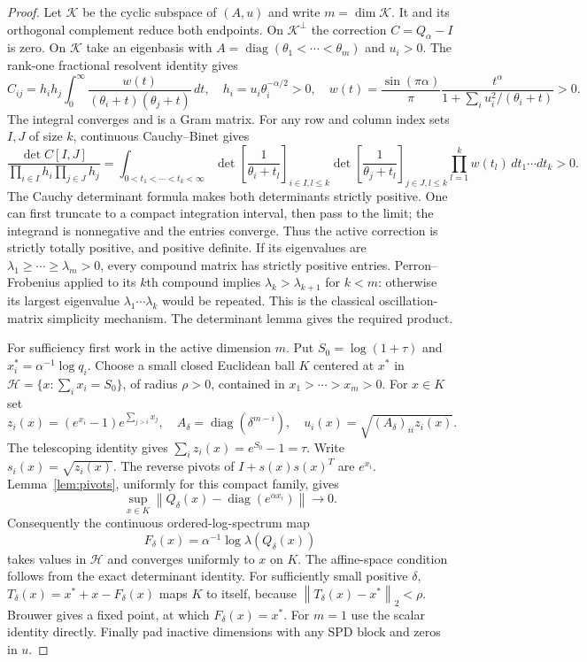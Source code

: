 \documentclass[11pt]{article}
\newcommand{\diag}{\operatorname{diag}}
\newcommand{\norm}[1]{\left\lVert#1\right\rVert}
\begin{document}
\begin{proof}
Let $\mathcal K$ be the cyclic subspace of $(A,u)$ and write
$m=\dim\mathcal K$. It and its orthogonal complement reduce both
endpoints. On $\mathcal K^\perp$ the correction $C=Q_\alpha-I$ is zero.
On $\mathcal K$ take an eigenbasis with
$A=\diag(\theta_1<\cdots<\theta_m)$ and $u_i>0$.
The rank-one fractional resolvent identity gives
\[
 C_{ij}=h_i h_j\int_0^\infty
 \frac{w(t)}{(\theta_i+t)(\theta_j+t)}\,dt,
 \quad h_i=u_i\theta_i^{-\alpha/2}>0,
 \quad
 w(t)=\frac{\sin(\pi\alpha)}\pi
 \frac{t^\alpha}{1+\sum_i u_i^2/(\theta_i+t)}>0.
\]
The integral converges and is a Gram matrix. For any row and column
index sets $I,J$ of size $k$, continuous Cauchy--Binet gives
\[
 \frac{\det C[I,J]}{\prod_{i\in I}h_i\prod_{j\in J}h_j}
 =\int_{0<t_1<\cdots<t_k<\infty}
 \det\left[\frac1{\theta_i+t_l}\right]_{i\in I,l\le k}
 \det\left[\frac1{\theta_j+t_l}\right]_{j\in J,l\le k}
 \prod_{l=1}^k w(t_l)\,dt_1\cdots dt_k>0.
\]
The Cauchy determinant formula makes both determinants strictly positive.
One can first truncate to a compact integration interval, then pass
to the limit; the integrand is nonnegative and the entries converge.
Thus the active correction is strictly totally positive, and positive
definite. If its eigenvalues are
$\lambda_1\ge\cdots\ge\lambda_m>0$, every compound matrix has
strictly positive entries. Perron--Frobenius applied to its $k$th
compound implies $\lambda_k>\lambda_{k+1}$ for $k<m$:
otherwise its largest eigenvalue $\lambda_1\cdots\lambda_k$ would be
repeated. This is the classical oscillation-matrix simplicity mechanism.
The determinant lemma gives the required product.

For sufficiency first work in the active dimension $m$.
Put $S_0=\log(1+\tau)$ and $x_i^*=\alpha^{-1}\log q_i$.
Choose a small closed Euclidean ball $K$ centered at $x^*$ in
$\mathcal H=\{x:\sum_i x_i=S_0\}$, of radius $\rho>0$,
contained in $x_1>\cdots>x_m>0$. For $x\in K$ set
\[
 z_i(x)=(e^{x_i}-1)e^{\sum_{j>i}x_j},\quad
 A_\delta=\diag(\delta^{m-i}),\quad
 u_i(x)=\sqrt{(A_\delta)_{ii}z_i(x)}.
\]
The telescoping identity gives $\sum_i z_i(x)=e^{S_0}-1=\tau$.
Write $s_i(x)=\sqrt{z_i(x)}$. The reverse pivots of
$I+s(x)s(x)^T$ are $e^{x_i}$.
Lemma~\ref{lem:pivots}, uniformly for this compact family, gives
\[
 \sup_{x\in K}\norm{Q_\delta(x)-\diag(e^{\alpha x_i})}
 \longrightarrow0.
\]
Consequently the continuous ordered-log-spectrum map
\[
 F_\delta(x)=\alpha^{-1}\log\lambda(Q_\delta(x))
\]
takes values in $\mathcal H$ and converges uniformly to $x$ on $K$.
The affine-space condition follows from the exact determinant identity.
For sufficiently small positive $\delta$,
$T_\delta(x)=x^*+x-F_\delta(x)$ maps $K$ to itself, because
$\norm{T_\delta(x)-x^*}_2<\rho$.
Brouwer gives a fixed point, at which $F_\delta(x)=x^*$.
For $m=1$ use the scalar identity directly. Finally pad inactive
dimensions with any SPD block and zeros in $u$.
\end{proof}
\end{document}
